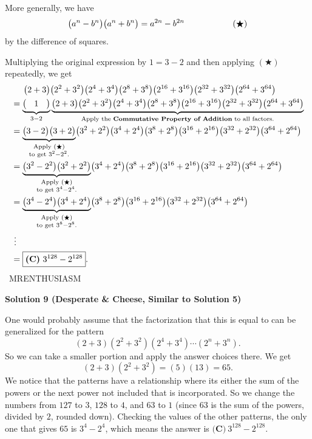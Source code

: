 \begin{enumerate}
More generally, we have 
 \[\bigl(a^n-b^n\bigr)\bigl(a^n+b^n\bigr)=a^{2n}-b^{2n}\hspace{20mm}(\bigstar)\] by the difference of squares.

 Multiplying the original expression by $1=3-2$ and then applying $(\bigstar)$ repeatedly, we get
 \begin{align*} &\hspace{5.125mm}\bigl(2+3\bigr)\bigl(2^2+3^2\bigr)\bigl(2^4+3^4\bigr)\bigl(2^8+3^8\bigr)\bigl(2^{16}+3^{16}\bigr)\bigl(2^{32}+3^{32}\bigr)\bigl(2^{64}+3^{64}\bigr) \\ &=\underbrace{\bigl(\hspace{3.25mm}1\hspace{3.25mm}\bigr)}_{3-2}\underbrace{\bigl(2+3\bigr)\bigl(2^2+3^2\bigr)\bigl(2^4+3^4\bigr)\bigl(2^8+3^8\bigr)\bigl(2^{16}+3^{16}\bigr)\bigl(2^{32}+3^{32}\bigr)\bigl(2^{64}+3^{64}\bigr)}_{\text{Apply the }\textbf{Commutative Property of Addition}\text{ to all factors.}} \\ &=\underbrace{\bigl(3-2\bigr)\bigl(3+2\bigr)}_{\substack{\text{Apply }(\bigstar) \\ \text{to get }3^2-2^2.}}\bigl(3^2+2^2\bigr)\bigl(3^4+2^4\bigr)\bigl(3^8+2^8\bigr)\bigl(3^{16}+2^{16}\bigr)\bigl(3^{32}+2^{32}\bigr)\bigl(3^{64}+2^{64}\bigr) \\ &=\underbrace{\bigl(3^2-2^2\bigr)\bigl(3^2+2^2\bigr)}_{\substack{\text{Apply }(\bigstar) \\ \text{to get }3^4-2^4.}}\bigl(3^4+2^4\bigr)\bigl(3^8+2^8\bigr)\bigl(3^{16}+2^{16}\bigr)\bigl(3^{32}+2^{32}\bigr)\bigl(3^{64}+2^{64}\bigr) \\ &=\underbrace{\bigl(3^4-2^4\bigr)\bigl(3^4+2^4\bigr)}_{\substack{\text{Apply }(\bigstar) \\ \text{to get }3^8-2^8.}}\bigl(3^8+2^8\bigr)\bigl(3^{16}+2^{16}\bigr)\bigl(3^{32}+2^{32}\bigr)\bigl(3^{64}+2^{64}\bigr) \\ & \ \vdots \\ &=\boxed{\textbf{(C)} ~3^{128}-2^{128}}. \end{align*}
~MRENTHUSIASM

 



\textbf{Solution 9 (Desperate & Cheese, Similar to Solution 5)}

One would probably assume that the factorization that this is equal to can be generalized for the pattern 
 \[(2+3)(2^2 + 3^2)(2^4+3^4)\cdots(2^n + 3^n).\]So we can take a smaller portion and apply the answer choices there. We get
 \[(2+3)(2^2 + 3^2) = (5)(13) = 65.\]We notice that the patterns have a relationship where its either the sum of the powers or the next power not included that is incorporated. So we change the numbers from $127$ to $3$, $128$ to $4$, and $63$ to $1$ (since $63$ is the sum of the powers, divided by $2$, rounded down). Checking the values of the other patterns, the only one that gives $65$ is $3^4 - 2^4$, which means the answer is $\boxed{\textbf{(C)} ~3^{128}-2^{128}}.$


\end{enumerate}
